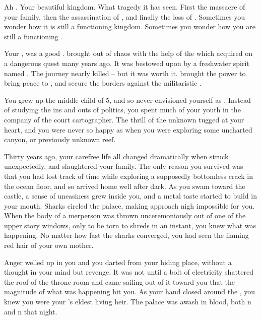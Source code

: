 \documentclass[char]{NeptuneBall}
\begin{document}
\name{\cKing{}}



Ah \pAtlantis{}. Your beautiful kingdom. What tragedy it has seen. First the massacre of your family, then the assassination of \cQueen{\King{}} \cQueen{}, and finally the loss of \cAriel{\Prince{}} \cAriel{}. Sometimes you wonder how it is still a functioning kingdom. Sometimes you wonder how you are still a functioning \cKing{\King{}}.

Your \cExKing{\parent{}}, \cExKing{\King} \cExKing{} was a good \cExKing{\King{}}. \cExKing{\They{}} brought \pAtlantis{} out of chaos with the help of the \iTrident{\MYname{}} which \cExKing{\they{}} acquired on a dangerous quest many years ago. It was bestowed upon \cExKing{\them{}} by a freshwater spirit named \cNixie{}. The journey nearly killed \cExKing{\them{}} -- but it was worth it. \iTrident{\MYname{}} brought \cExKing{} the power to bring peace to \pAtlantis{}, and secure the borders against the militaristic \pPacifica{}.

You grew up the middle child of 5, and so never envisioned yourself as \cKing{\King{}}. Instead of studying the ins and outs of politics, you spent much of your youth in the company of the court cartographer. The thrill of the unknown tugged at your heart, and you were never so happy as when you were exploring some uncharted canyon, or previously unknown reef.

Thirty years ago, your carefree life all changed dramatically when \pPacifica{} struck unexpectedly, and slaughtered your family. The only reason you survived was that you had lost track of time while exploring a supposedly bottomless crack in the ocean floor, and so arrived home well after dark. As you swam toward the castle, a sense of uneasiness grew inside you, and a metal taste started to build in your mouth. Sharks circled the palace, making approach nigh impossible for you. When the body of a merperson was thrown unceremoniously out of one of the upper story windows, only to be torn to shreds in an instant, you knew what was happening. No matter how fast the sharks converged, you had seen the flaming red hair of your own mother.

Anger welled up in you and you darted from your hiding place, without a thought in your mind but revenge. It was not until a bolt of electricity shattered the roof of the throne room and \iTrident{\MYname{}} came sailing out of it toward you that the magnitude of what was happening hit you. As your hand closed around the \iTrident{\MYname{}}, you knew you were your \cExKing{\parent{}}'s eldest living heir. The palace was awash in blood, both \pPacifica{}n and \pAtlantis{}n that night. 
\end{document}
